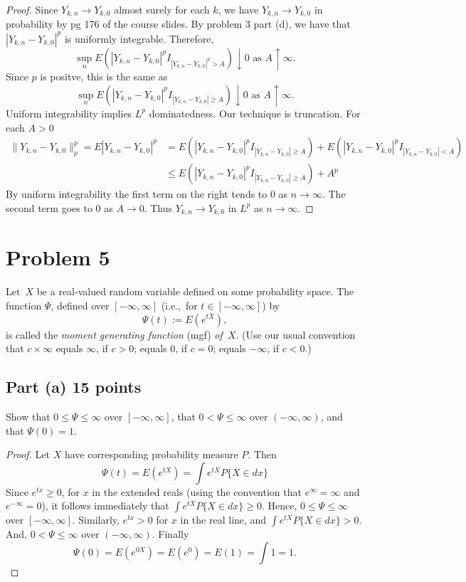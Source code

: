 \documentclass[letterpaper, 12pt]{article}
\begin{document}
\begin{proof}
Since $Y_{k,n} \to Y_{k,0}$ almost surely for each $k$, we have $Y_{k,n} \to Y_{k,0}$ in probability by pg 176 of the course slides. 
By problem 3 part (d), we have that $|Y_{k, n} - Y_{k, 0}|^p$ is uniformly integrable. Therefore,
\[
\sup_{n} E( |Y_{k,n} - Y_{k,0}|^p I_{|Y_{k,n} - Y_{k,0}|^p > A}) \downarrow 0 \text{ as } A \uparrow \infty
\text{.}
\]
Since $p$ is positve, this is the same as 
\[
\sup_{n} E( |Y_{k,n} - Y_{k,0}|^p I_{|Y_{k,n} - Y_{k,0}| \geq A}) \downarrow 0 \text{ as } A \uparrow \infty
\text{.}
\]
Uniform integrability implies $L^p$ dominatedness.
Our technique is truncation. For each $A > 0$ 
\begin{align*}
\|  Y_{k,n} - Y_{k,0} \|_p^p = E|Y_{k,n} - Y_{k,0}|^p 
&= E(|Y_{k,n} - Y_{k,0}|^p  I_{|Y_{k,n} - Y_{k,0}| \geq A}) + E(|Y_{k,n} - Y_{k,0}|^p  I_{|Y_{k,n} - Y_{k,0}| < A})  \\
&\leq E(|Y_{k,n} - Y_{k,0}|^p  I_{|Y_{k,n} - Y_{k,0}| \geq A}) + A^p 
\end{align*}
By uniform integrability the first term on the right tends to $0$ as $n \to \infty$. The second term goes to $0$ as $A \to 0$. Thus $Y_{k, n} \to Y_{k, 0}$ in $L^p$ as $n \to \infty$. 
\end{proof}
\pagebreak


\section*{Problem 5}
Let~$X$ be a real-valued random variable defined on some probability space.  The
function $\Psi$, defined over $[-\infty,\infty]$ (i.e.,\ for $t \in
[-\infty,\infty]$) by
$$
\Psi(t) := E \left( e^{tX} \right),
$$
is called the {\em moment generating function\/} (mgf) {\em of~$X$\/}.  (Use our
usual convention that $c \times \infty$ equals $\infty$, if $c > 0$; equals $0$,
if $c = 0$; equals $-\infty$, if $c < 0$.)

\subsection*{Part (a) 15 points}
Show that $0 \leq \Psi \leq \infty$ over $[-\infty,\infty]$, that $0 < \Psi \leq \infty$ over $(-\infty,\infty)$, and that $\Psi(0) = 1$.
\begin{proof}
Let $X$ have corresponding probability measure $P$. Then
\[
\Psi(t) = E(e^{tX}) = \int e^{tX} P \{X \in dx\}
\]
Since $e^{tx} \geq 0$, for $x$ in the extended reals (using the convention that $e^\infty = \infty$ and $e^{-\infty} = 0$), it follows immediately that $\int e^{tX} P\{X \in dx\} \geq 0$. Hence, $0 \leq \Psi \leq \infty$ over $[-\infty,\infty]$. Similarly, $e^{tx} > 0$ for $x$ in the real line, and $\int e^{tX} P\{X \in dx\} > 0$. And, $0 < \Psi \leq \infty$ over $(-\infty,\infty)$. 
Finally 
\[
\Psi(0) = E(e^{0X}) = E(e^0) = E(1) = \int 1 = 1
\text{.}
\]
\end{proof}
\pagebreak
\end{document}
